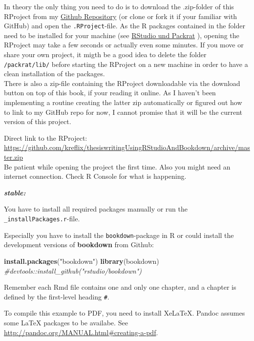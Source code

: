 \documentclass[]{book}
\makeatletter
\newenvironment{Shaded}{\begin{snugshade}}{\end{snugshade}}
\newcommand{\KeywordTok}[1]{\textcolor[rgb]{0.13,0.29,0.53}{\textbf{{#1}}}}
\newcommand{\StringTok}[1]{\textcolor[rgb]{0.31,0.60,0.02}{{#1}}}
\newcommand{\CommentTok}[1]{\textcolor[rgb]{0.56,0.35,0.01}{\textit{{#1}}}}
\newcommand{\NormalTok}[1]{{#1}}
\newenvironment{kframe}{%
\medskip{}
\setlength{\fboxsep}{.8em}
 \def\at@end@of@kframe{}%
 \ifinner\ifhmode%
  \def\at@end@of@kframe{\end{minipage}}%
  \begin{minipage}{\columnwidth}%
 \fi\fi%
 \def\FrameCommand##1{\hskip\@totalleftmargin \hskip-\fboxsep
 \colorbox{shadecolor}{##1}\hskip-\fboxsep
     \hskip-\linewidth \hskip-\@totalleftmargin \hskip\columnwidth}%
 \MakeFramed {\advance\hsize-\width
   \@totalleftmargin\z@ \linewidth\hsize
   \@setminipage}}%
 {\par\unskip\endMakeFramed%
 \at@end@of@kframe}
\renewenvironment{Shaded}{\begin{kframe}}{\end{kframe}}
\theoremstyle{definition}
\theoremstyle{definition}
\theoremstyle{remark}
\let\BeginKnitrBlock\begin \let\EndKnitrBlock\end
\makeatother
\begin{document}
In theory the only thing you need to do is to download the .zip-folder
of this RProject from my
\href{https://github.com/kreflix/thesiswritingUsingRStudioAndBookdown}{Github
Repository} (or clone or fork it if your familiar with GitHub) and open
the \texttt{.RProject}-file. As the R packages contained in the folder
need to be installed for your machine (see
\protect\hyperlink{rstudio-und-packrat}{RStudio und Packrat} ), opening
the RProject may take a few seconds or actually even some minutes. If
you move or share your own project, it migth be a good idea to delete
the folder \texttt{/packrat/lib/} before starting the RProject on a new
machine in order to have a clean installation of the packages.\\
There is also a zip-file containing the RProject downloadable via the
download button on top of this book, if your reading it online. As I
haven't been implementing a routine creating the latter zip
automatically or figured out how to link to my GitHub repo for now, I
cannot promise that it will be the current version of this project.

\BeginKnitrBlock{rmdimportant}
Direct link to the RProject:\\
\url{https://github.com/kreflix/thesiswritingUsingRStudioAndBookdown/archive/master.zip}\\
Be patient while opening the project the first time. Also you might need
an internet connection. Check R Console for what is happening.
\EndKnitrBlock{rmdimportant}

\textbf{\emph{stable:}}

You have to install all required packages manually or run the
\texttt{\_installPackages.r}-file.

Especially you have to install the \texttt{bookdown}-package in R or
could install the development versions of \textbf{bookdown} from Github:

\begin{Shaded}
\begin{Highlighting}[]
\KeywordTok{install.packages}\NormalTok{(}\StringTok{"bookdown"}\NormalTok{)}
\KeywordTok{library}\NormalTok{(bookdown)}
\CommentTok{#devtools::install_github("rstudio/bookdown")}
\end{Highlighting}
\end{Shaded}

Remember each Rmd file contains one and only one chapter, and a chapter
is defined by the first-level heading \texttt{\#}.

To compile this example to PDF, you need to install XeLaTeX. Pandoc
assumes some LaTeX packages to be availabe. See
\url{http://pandoc.org/MANUAL.html\#creating-a-pdf}.
\end{document}
